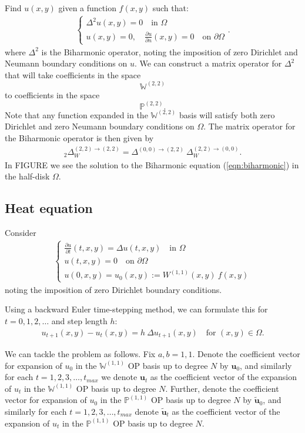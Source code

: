 \documentclass[11pt, oneside]{article}   	%
\newcommand{\bigP}{\mathbb{P}}
\newcommand{\Wii}{W^{(1,1)}}
\newcommand{\bigPii}{{\mathbb{P}^{(1,1)}}}
\newcommand{\laplacewtt}{\Delta_W^{(2,2)\to(0,0)}}
\newcommand{\laplaceoo}{\Delta^{(0,0)\to(2,2)}}
\newcommand{\biharmonic}{_2\Delta_W^{(2,2)\to(2,2)}}
\newcommand{\bigW}{\mathbb{W}}
\newcommand{\bigWii}{{\mathbb{W}^{(1,1)}}}
\begin{document}
Find \(u(x,y)\) given a function \(f(x,y)\) such that:
\begin{align}
	\begin{cases}
    		\Delta^2 u(x,y) = 0 \quad \text{in } \Omega \\
		u(x,y) = 0, \quad \frac{\partial u}{\partial n}(x,y) = 0 \quad \text{on } \partial \Omega
	\end{cases}.
	\label{eqn:biharmonic}
\end{align}
where $\Delta^2$ is the Biharmonic operator, noting the imposition of zero Dirichlet and Neumann boundary conditions on $u$. We can construct a matrix operator for $\Delta^2$ that will take coefficients in the space
$$
\bigW^{(2,2)}
$$
to coefficients in the space
$$
\bigP^{(2,2)}.
$$
Note that any function expanded in the $\bigW^{(2,2)}$ basis will satisfy both zero Dirichlet and zero Neumann boundary conditions on $\Omega$. The matrix operator for the Biharmonic operator is then given by
\begin{align}
	\biharmonic = \laplaceoo \: \laplacewtt.
\end{align}
In FIGURE we see the solution to the Biharmonic equation (\ref{eqn:biharmonic}) in the half-disk $\Omega$.


\subsection{Heat equation}
Consider
\begin{align}
	\begin{cases}
		\frac{\partial u}{\partial t}(t,x,y) = \Delta u(t,x,y) \quad \text{in } \Omega \\
		u(t, x, y) = 0 \quad \text{on } \partial \Omega \\
		u(0, x, y) = u_0(x,y) := \Wii(x,y) \: f(x,y)
	\end{cases}
\end{align}
noting the imposition of zero Dirichlet boundary conditions.

Using a backward Euler time-stepping method, we can formulate this for \(t = 0,1,2,\dots\) and step length $h$:
\begin{align}
u_{t+1}(x,y) - u_t (x,y) = h \: \Delta u_{t+1}(x,y) \quad \text{for } (x,y) \in \Omega.
\end{align}

We can tackle the problem as follows. Fix \(a, b = 1,1\). Denote the coefficient vector for expansion of $u_0$ in the $\bigWii$ OP basis up to degree $N$ by $\mathbf{u}_0$, and similarly for each $t = 1,2,3,\dots,t_{max}$ we denote $\mathbf{u}_t$ as the coefficient vector of the expansion of $u_t$ in the $\bigWii$ OP basis up to degree $N$. Further, denote the coefficient vector for expansion of $u_0$ in the $\bigPii$ OP basis up to degree $N$ by $\mathbf{\tilde{u}}_0$, and similarly for each $t = 1,2,3,\dots,t_{max}$ denote $\mathbf{\tilde{u}}_t$ as the coefficient vector of the expansion of $u_t$ in the $\bigPii$ OP basis up to degree $N$.
\end{document}
